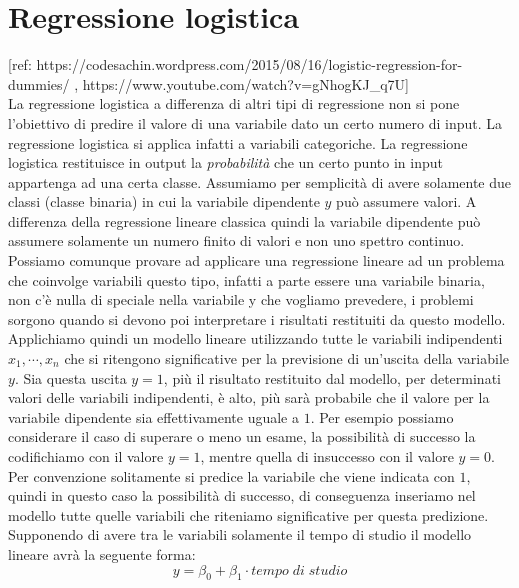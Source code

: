 \documentclass[]{article}
\begin{document}
\section{Regressione logistica}
[ref: https://codesachin.wordpress.com/2015/08/16/logistic-regression-for-dummies/ , https://www.youtube.com/watch?v=gNhogKJ\_q7U]\\
La regressione logistica a differenza di altri tipi di regressione non si pone l'obiettivo di predire il valore di una variabile dato un certo numero di input. La regressione logistica si applica infatti a variabili categoriche. La regressione logistica restituisce in output la \textit{probabilità} che un certo punto in input appartenga ad una certa classe. Assumiamo per semplicità di avere solamente due classi (classe binaria) in cui la variabile dipendente $y$ può assumere valori. A differenza della regressione lineare classica quindi la variabile dipendente può assumere solamente un numero finito di valori e non uno spettro continuo. Possiamo comunque provare ad applicare una regressione lineare ad un problema che coinvolge variabili questo tipo, infatti a parte essere una variabile binaria, non c'è nulla di speciale nella variabile y che vogliamo prevedere, i problemi sorgono quando si devono poi interpretare i risultati restituiti da questo modello. Applichiamo quindi un modello lineare utilizzando tutte le variabili indipendenti $x_1, \cdots, x_n$ che si ritengono significative per la previsione di un'uscita della variabile $y$. Sia questa uscita $y=1$, più il risultato restituito dal modello, per determinati valori delle variabili indipendenti, è alto, più sarà probabile che il valore per la variabile dipendente sia effettivamente uguale a $1$. Per esempio possiamo considerare il caso di superare o meno un esame, la possibilità di successo la codifichiamo con il valore $y=1$, mentre quella di insuccesso con il valore $y=0$. Per convenzione solitamente si predice la variabile che viene indicata con $1$, quindi in questo caso la possibilità di successo, di conseguenza inseriamo nel modello tutte quelle variabili che riteniamo significative per questa predizione. Supponendo di avere tra le variabili solamente il tempo di studio il modello lineare avrà la seguente forma:
\begin{equation}
y = \beta_0 + \beta_1\cdot tempo\;di\;studio
\label{eq: esempio-regressione-lineare-logistica}
\end{equation}
\end{document}
